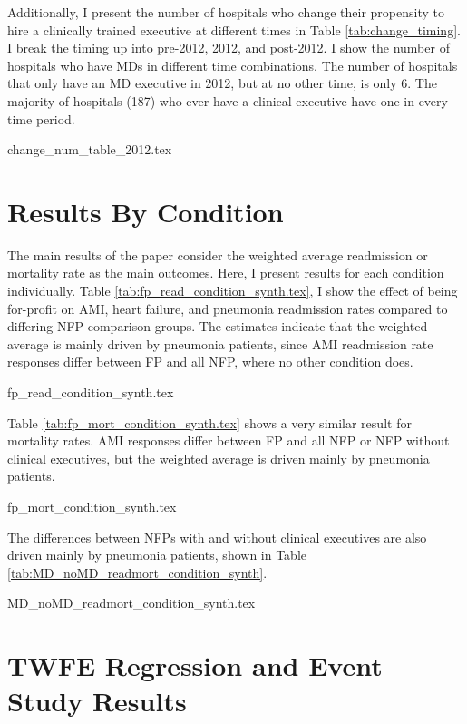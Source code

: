 \documentclass[12pt]{article}
\begin{document}
Additionally, I present the number of hospitals who change their propensity to hire a clinically trained executive at different times in Table \ref{tab:change_timing}. I break the timing up into pre-2012, 2012, and post-2012. I show the number of hospitals who have MDs in different time combinations. The number of hospitals that only have an MD executive in 2012, but at no other time, is only 6. The majority of hospitals (187) who ever have a clinical executive have one in every time period. 

{change_num_table_2012.tex}

\section{Results By Condition}\label{app:condition}

The main results of the paper consider the weighted average readmission or mortality rate as the main outcomes. Here, I present results for each condition individually. Table \ref{tab:fp_read_condition_synth.tex}, I show the effect of being for-profit on AMI, heart failure, and pneumonia readmission rates compared to differing NFP comparison groups. The estimates indicate that the weighted average is mainly driven by pneumonia patients, since AMI readmission rate responses differ between FP and all NFP, where no other condition does. 

{fp_read_condition_synth.tex}

Table \ref{tab:fp_mort_condition_synth.tex} shows a very similar result for mortality rates. AMI responses differ between FP and all NFP or NFP without clinical executives, but the weighted average is driven mainly by pneumonia patients. 

{fp_mort_condition_synth.tex}

The differences between NFPs with and without clinical executives are also driven mainly by pneumonia patients, shown in Table \ref{tab:MD_noMD_readmort_condition_synth}.

{MD_noMD_readmort_condition_synth.tex}

\section{TWFE Regression and Event Study Results}\label{app:fullsample}
\end{document}
